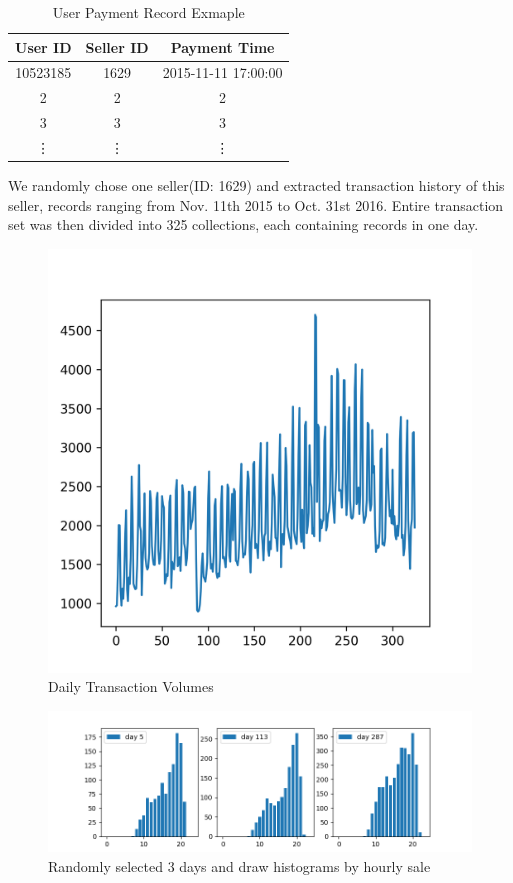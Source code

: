 \documentclass[a4paper]{IEEEtran}
\begin{document}
			\begin{table}[!ht]
				\centering
				\caption{User Payment Record Exmaple}
				\label{tab:user-payment-sample}
				\begin{tabular}{|c|c|c|}
					\hline
					User ID & Seller ID & Payment Time\\
					\hline
					10523185 & 1629 & 2015-11-11 17:00:00\\
					\hline
					2 & 2 & 2\\
					\hline
					3 & 3 & 3\\
					\hline
					\vdots & \vdots & \vdots\\
					\hline
				\end{tabular}
			\end{table}
			
			We randomly chose one seller(ID: 1629) and extracted transaction history of this seller, records ranging from Nov. 11th 2015 to Oct. 31st 2016. Entire transaction set was then divided into 325 collections, each containing records in one day. 
			
			
			\begin{figure}[!ht]
				\centering
				\includegraphics[width=0.75\linewidth]{fig/DailyTransactionVolume.png}
				\caption{Daily Transaction Volumes}
				\label{fig:daily-transaction-volume}
			\end{figure}
			
			\begin{figure}[ht]
				\centering
				\includegraphics[width=\linewidth]{fig/SaleDistributionSamples.png}
				\caption{Randomly selected 3 days and draw histograms by hourly sale}
				\label{fig:sale-distribution-sample}
			\end{figure}
			
\end{document}
